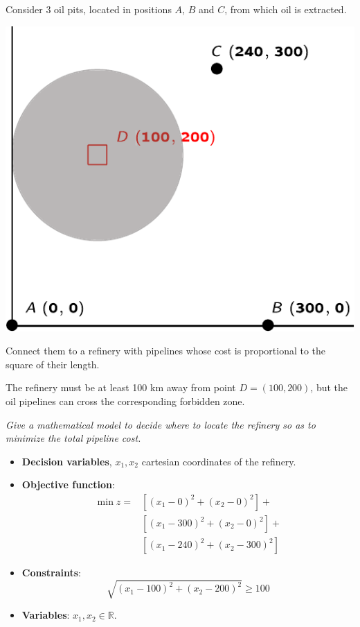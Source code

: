 \newpage

\begin{examplebox}
    Consider 3 oil pits, located in positions $A$, $B$ and $C$, from which oil is extracted.

    \begin{center}
        \includegraphics[width=.6\textwidth]{img/facility-location-1.pdf}
    \end{center}

    Connect them to a refinery with pipelines whose cost is proportional to the square of their length.

    The refinery must be at least 100 km away from point $D = \left(100, 200\right)$, but the oil pipelines can cross the corresponding forbidden zone.

    \emph{Give a mathematical model to decide where to locate the refinery so as to minimize the total pipeline cost.}

    \begin{itemize}
        \item \textbf{Decision variables}, $x_{1}, x_{2}$ cartesian coordinates of the refinery.
        
        \item \textbf{Objective function}:
        \begin{equation*}
            \begin{array}{rl}
                \min z = & \left[\left(x_{1} - 0\right)^{2} + \left(x_{2} - 0\right)^{2}\right] + \\ [.5em]
                         & \left[\left(x_{1} - 300\right)^{2} + \left(x_{2} - 0\right)^{2}\right] + \\ [.5em]
                         & \left[\left(x_{1} - 240\right)^{2} + \left(x_{2} - 300\right)^{2}\right]
            \end{array}
        \end{equation*}

        \item \textbf{Constraints}:
        \begin{equation*}
            \sqrt{
                \left(x_{1}-100\right)^{2} + \left(x_{2} - 200\right)^{2}
            } \ge 100
        \end{equation*}

        \item \textbf{Variables}: $x_{1}, x_{2} \in \mathbb{R}$.
    \end{itemize}
\end{examplebox}